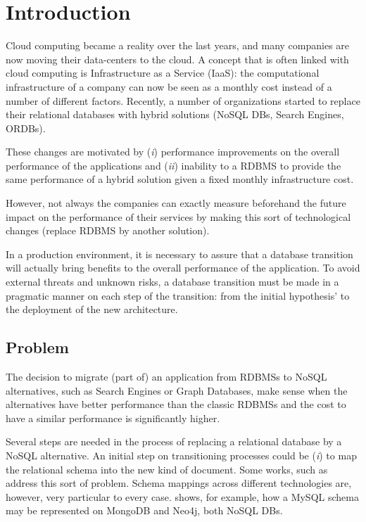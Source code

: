 \chapter{Introduction}

Cloud computing became a reality over the last years, and many companies are now moving their data-centers to the cloud. 
A concept that is often linked with cloud computing is Infrastructure as a Service (IaaS): the computational infrastructure of a company can now be seen as a monthly cost instead of a number of different factors. 
Recently, a number of organizations started to replace their relational databases with hybrid solutions (NoSQL DBs, Search Engines, ORDBs). 

These changes are motivated by (\textit{i}) performance improvements on the overall performance of the applications and (\textit{ii}) inability to a RDBMS to provide the same performance of a hybrid solution given a fixed monthly infrastructure cost.

However, not always the companies can exactly measure beforehand the future impact on the performance of their services by making this sort of technological changes (replace RDBMS by another solution).

In a production environment, it is necessary to assure that a database transition will actually bring benefits to the overall performance of the application. To avoid external threats and unknown risks, a database transition must be made in a pragmatic manner on each step of the transition: from the initial hypothesis' to the deployment of the new architecture.


\section{Problem}

The decision to migrate (part of) an application from RDBMSs to NoSQL alternatives, such as Search Engines or Graph Databases, make sense when the alternatives have better performance than the classic RDBMSs and the cost to have a similar performance is significantly higher. 

Several steps are needed in the process of replacing a relational database by a NoSQL alternative. An initial step on transitioning processes could be (\textit{i}) to map the relational schema into the new kind of document. Some works, such as \cite{lombardo2012issues} \cite{zhu2012data} address this sort of problem. Schema mappings across different technologies are, however, very particular to every case. \cite{bahl2014mysql} shows, for example, how a MySQL schema may be represented on MongoDB and Neo4j, both NoSQL DBs.


